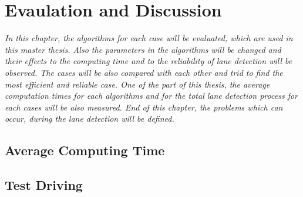%
\chapter{Evaulation and Discussion}
\label{cha:Evaulation and Discussion}

\emph{\color{blue}In this chapter, the algorithms for each case will be evaluated, which are used in this master thesis. Also the parameters in the algorithms will be changed and their effects to the computing time and to the reliability of lane detection will be observed. The cases will be also compared with each other and trid to find the most efficient and reliable case. One of the part of this thesis, the average computation times for each algorithms and for the total lane detection process for each cases will be also measured. End of this chapter, the problems which can occur, during the lane detection will be defined.}
%

\section{Average Computing Time}\label{sec:Average Computing Time}



\section{Test Driving}\label{sec:Test Driving}
